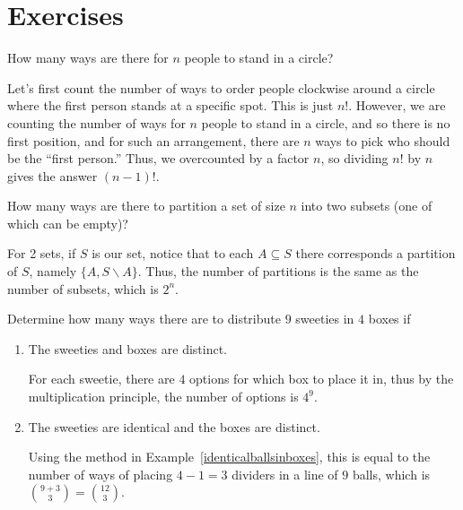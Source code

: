 \documentclass[11pt,dvipsnames]{book}
\numberwithin{figure}{section} %
\numberwithin{table}{section} %
\begin{document}
\section{Exercises}%
\label{countingexercises}

\begin{exercise}
 How many ways are there for $n$ people to stand in a circle?

 \begin{solution}
 Let's first count the number of ways to order people clockwise around a circle where the first person stands at a specific spot. This is just $n!$. However, we are counting the number of ways for $n$ people to stand in a circle, and so there is no first position, and for such an arrangement, there are $n$ ways to pick who should be the ``first person.'' Thus, we overcounted by a factor $n$, so dividing $n!$ by $n$ gives the answer $(n-1)!$.
 \end{solution}
 \end{exercise}

\begin{exercise}
How many ways are there to partition a set of size $n$ into two subsets (one of which can be empty)?
\begin{solution}
For 2 sets, if $S$ is our set, notice that to each $A\subseteq S$ there corresponds a partition of $S$, namely $\{A,S\backslash A\}$. Thus, the number of partitions is the same as the number of subsets, which is $2^{n}$.
\end{solution}
\end{exercise}

\begin{exercise}
Determine how many ways there are to distribute $9$ sweeties in $4$ boxes if
\begin{enumerate}[label=(\alph*)]
\item The sweeties and boxes are distinct.
\begin{solution}
For each sweetie, there are $4$ options for which box to place it in, thus by the multiplication principle, the number of options is $4^{9}$.
\end{solution}
\item The sweeties are identical and the boxes are distinct.
\begin{solution}
Using the method in Example~\ref{identicalballsinboxes}, this is equal to the number of ways of placing $4-1 = 3$ dividers in a line of $9$ balls, which is ${{9+3}\choose {3}} = {12 \choose 3}$.
\end{solution}
\end{enumerate}
\end{exercise}
\end{document}
